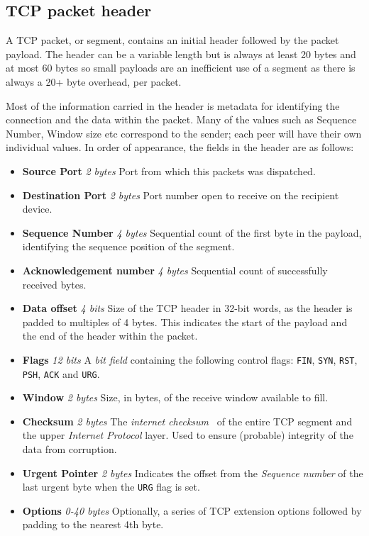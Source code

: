\documentclass[11pt,a4paper,british]{bhamarticle}
\begin{document}
\begin{multicols}{2}
\subsection{TCP packet header}
A TCP packet, or segment, contains an initial header followed by the packet payload. The header can be a variable length but is always at least 20 bytes and at most 60 bytes so small payloads are an inefficient use of a segment as there is always a 20+ byte overhead, per packet.

Most of the information carried in the header is metadata for identifying the connection and the data within the packet. Many of the values such as Sequence Number, Window size etc correspond to the sender; each peer will have their own individual values. In order of appearance, the fields in the header are as follows:

\begin{itemize}
    \item \textbf{Source Port} \textit{2 bytes} Port from which this packets was dispatched.
    \item \textbf{Destination Port} \textit{2 bytes} Port number open to receive on the recipient device.
    \item \textbf{Sequence Number} \textit{4 bytes} Sequential count of the first byte in the payload, identifying the sequence position of the segment.
    \item \textbf{Acknowledgement number} \textit{4 bytes} Sequential count of successfully received bytes.
    \item \textbf{Data offset} \textit{4 bits} Size of the TCP header in 32-bit words, as the header is padded to multiples of 4 bytes. This indicates the start of the payload and the end of the header within the packet.
    \item \textbf{Flags} \textit{12 bits} A \textit{bit field} containing the following control flags: \texttt{FIN}, \texttt{SYN}, \texttt{RST}, \texttt{PSH}, \texttt{ACK} and \texttt{URG}.
    \item \textbf{Window} \textit{2 bytes} Size, in bytes, of the receive window available to fill.
    \item \textbf{Checksum} \textit{2 bytes} The \textit{internet checksum}~\cite{internetchecksum} of the entire TCP segment and the upper \textit{Internet Protocol} layer. Used to ensure (probable) integrity of the data from corruption.
    \item \textbf{Urgent Pointer} \textit{2 bytes} Indicates the offset from the \textit{Sequence number} of the last urgent byte when the \texttt{URG} flag is set.
    \item \textbf{Options} \textit{0-40 bytes} Optionally, a series of TCP extension options followed by padding to the nearest 4th byte.%
\end{itemize}


\end{multicols}
\end{document}
